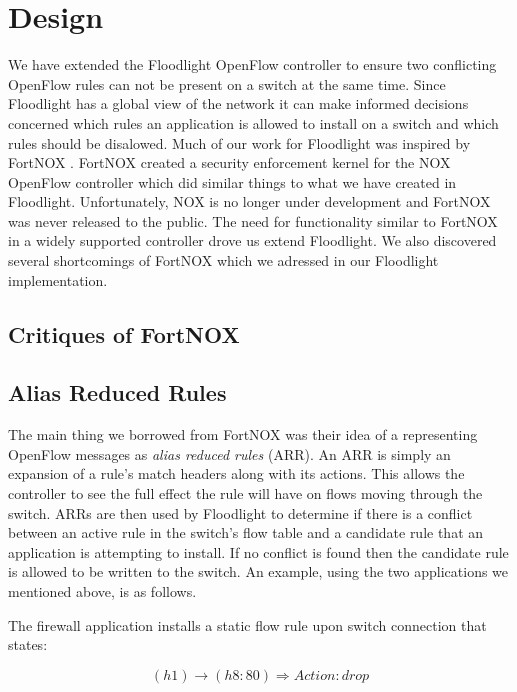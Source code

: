\section{Design}
\label{sec:design}

We have extended the Floodlight OpenFlow controller to ensure two conflicting OpenFlow rules can not be present on a switch at the same time.
Since Floodlight has a global view of the network it can make informed decisions concerned which rules an application is allowed to install on a switch and which rules should be disalowed.
Much of our work for Floodlight was inspired by FortNOX \cite{Porras:2012:SEK:2342441.2342466}.
FortNOX created a security enforcement kernel for the NOX OpenFlow controller \cite{Gude:2008:NTO:1384609.1384625} which did similar things to what we have created in Floodlight.
Unfortunately, NOX is no longer under development and FortNOX was never released to the public.
The need for functionality similar to FortNOX in a widely supported controller drove us extend Floodlight.
We also discovered several shortcomings of FortNOX which we adressed in our Floodlight implementation.

\subsection{Critiques of FortNOX}
\label{subsec:critique}

\subsection{Alias Reduced Rules}
\label{subsec:arr}
The main thing we borrowed from FortNOX was their idea of a representing OpenFlow messages as \emph{alias reduced rules} (ARR).
An ARR is simply an expansion of a rule's match headers along with its actions.
This allows the controller to see the full effect the rule will have on flows moving through the switch.
ARRs are then used by Floodlight to determine if there is a conflict between an active rule in the switch's flow table and a candidate rule that an application is attempting to install.
If no conflict is found then the candidate rule is allowed to be written to the switch.
An example, using the two applications we mentioned above, is as follows.

The firewall application installs a static flow rule upon switch connection that states:

\begin{equation}\label{eq:staticfirewall}
(h1) \rightarrow (h8:80) \Rightarrow Action: drop
\end{equation}

